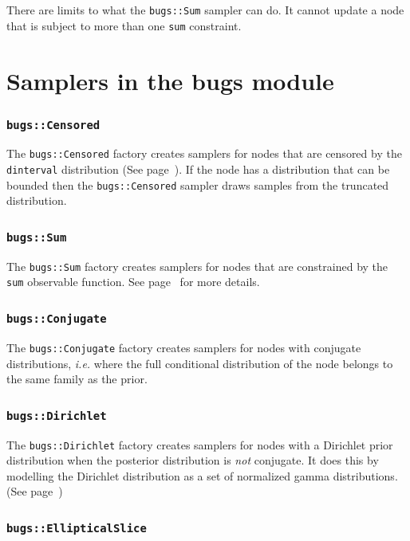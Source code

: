 \documentclass[11pt, a4paper, titlepage]{report}
\begin{document}
{There are limits to what the \texttt{bugs::Sum} sampler can do. It
cannot update a node that is subject to more than one \texttt{sum}
constraint.

\section{Samplers in the bugs module}


\subsubsection{\texttt{bugs::Censored}}

The \texttt{bugs::Censored} factory creates samplers for nodes that
are censored by the \texttt{dinterval} distribution (See
page~\pageref{bugs:dinterval}). If the node has a distribution that can be
bounded then the \texttt{bugs::Censored} sampler draws samples from
the truncated distribution.

\subsubsection{\texttt{bugs::Sum}}

The \texttt{bugs::Sum} factory creates samplers for nodes that are
constrained by the \texttt{sum} observable function. See
page~\pageref{bugs:sum} for more details.

\subsubsection{\texttt{bugs::Conjugate}}

The \texttt{bugs::Conjugate} factory creates samplers for nodes with
conjugate distributions, {\em i.e.} where the full conditional
distribution of the node belongs to the same family as the prior.

\subsubsection{\texttt{bugs::Dirichlet}}

The \texttt{bugs::Dirichlet} factory creates samplers for nodes with a
Dirichlet prior distribution when the posterior distribution is {\em
  not} conjugate. It does this by modelling the Dirichlet distribution
as a set of normalized gamma distributions. (See page~\pageref{bugs:ddirch})

\subsubsection{\texttt{bugs::EllipticalSlice}}

}
\end{document}
